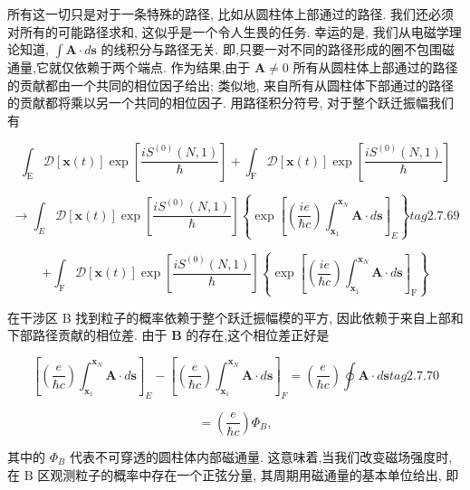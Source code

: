 \documentclass[lang=cn,newtx,10pt,scheme=chinese,thmcnt=section]{elegantbook}
\begin{document}
所有这一切只是对于一条特殊的路径, 比如从圆柱体上部通过的路径. 我们还必须对所有的可能路径求和, 这似乎是一个令人生畏的任务. 幸运的是, 我们从电磁学理论知道, $\int \mathbf{A} \cdot d\mathbf{s}$ 的线积分与路径无关. 即,只要一对不同的路径形成的圈不包围磁通量,它就仅依赖于两个端点. 作为结果,由于 $\mathbf{A} \neq 0$ 所有从圆柱体上部通过的路径的贡献都由一个共同的相位因子给出; 类似地, 来自所有从圆柱体下部通过的路径的贡献都将乘以另一个共同的相位因子. 用路径积分符号, 对于整个跃迁振幅我们有

$$
{\int }_{\mathrm{E}}\mathcal{D}\left\lbrack {\mathbf{x}\left( t\right) }\right\rbrack \exp \left\lbrack \frac{i{S}^{\left( 0\right) }\left( {N,1}\right) }{\hbar }\right\rbrack + {\int }_{\mathrm{F}}\mathcal{D}\left\lbrack {\mathbf{x}\left( t\right) }\right\rbrack \exp \left\lbrack \frac{i{S}^{\left( 0\right) }\left( {N,1}\right) }{\hbar }\right\rbrack
$$

$$
\rightarrow {\int }_{E}\mathcal{D}\left\lbrack {\mathbf{x}\left( t\right) }\right\rbrack \exp \left\lbrack \frac{i{S}^{\left( 0\right) }\left( {N,1}\right) }{\hbar }\right\rbrack \left\{ {\exp {\left\lbrack \left( \frac{ie}{\hbar c}\right) {\int }_{{\mathbf{x}}_{1}}^{{\mathbf{x}}_{N}}\mathbf{A} \cdot d\mathbf{s}\right\rbrack }_{E}}\right\} tag{2. 7.69}
$$

$$
+ {\int }_{\mathrm{F}}\mathcal{D}\left\lbrack {\mathbf{x}\left( t\right) }\right\rbrack \exp \left\lbrack \frac{i{S}^{\left( 0\right) }\left( {N,1}\right) }{\hbar }\right\rbrack \left\{ {\exp {\left\lbrack \left( \frac{ie}{\hbar c}\right) {\int }_{{\mathbf{x}}_{1}}^{{\mathbf{x}}_{N}}\mathbf{A} \cdot d\mathbf{s}\right\rbrack }_{\mathrm{F}}}\right\}
$$

在干涉区 B 找到粒子的概率依赖于整个跃迁振幅模的平方, 因此依赖于来自上部和下部路径贡献的相位差. 由于 $\mathbf{B}$ 的存在,这个相位差正好是

$$
{\left\lbrack \left( \frac{e}{\hbar c}\right) {\int }_{{\mathbf{x}}_{1}}^{{\mathbf{x}}_{N}}\mathbf{A} \cdot d\mathbf{s}\right\rbrack }_{E} - {\left\lbrack \left( \frac{e}{\hbar c}\right) {\int }_{{\mathbf{x}}_{1}}^{{\mathbf{x}}_{N}}\mathbf{A} \cdot d\mathbf{s}\right\rbrack }_{F} = \left( \frac{e}{\hbar c}\right) \oint \mathbf{A} \cdot d\mathbf{s} tag{2.7.70}
$$

$$
= \left( \frac{e}{\hbar c}\right) {\Phi }_{B},
$$

其中的 ${\Phi }_{B}$ 代表不可穿透的圆柱体内部磁通量. 这意味着,当我们改变磁场强度时,在 $\mathrm{B}$ 区观测粒子的概率中存在一个正弦分量, 其周期用磁通量的基本单位给出, 即
\end{document}
